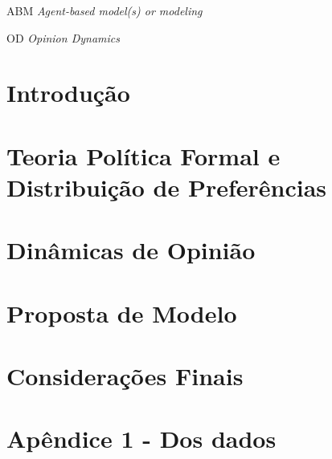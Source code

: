 \documentclass[
12pt,				%
openright,			%
oneside,			%
a4paper,			%
english, %
french, %
spanish, %
brazil %
]{abntex2}
\begin{document}
\begin{siglas}
\item[ABM] \textit{Agent-based model(s) or modeling}
  \item[OD] \textit{ Opinion Dynamics}
 
\end{siglas}
	\tableofcontents*
	\cleardoublepage
	\textual
	
	
	
\chapter*[Introdução]{Introdução}
      
\chapter{Teoria Política Formal e Distribuição de Preferências}


\chapter{Dinâmicas de Opinião}


 


 \chapter{Proposta de Modelo}

 



\chapter*[Considerações Finais]{Considerações Finais}


  
    

\chapter*[Apêndice 1]{Apêndice 1 - Dos dados}

	
\postextual
	

	
 \printindex
	
\end{document}
